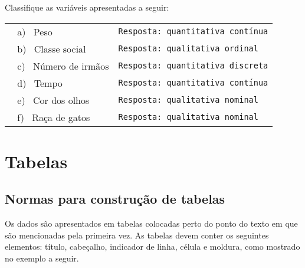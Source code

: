 \documentclass[11pt,fleqn]{book} %
\begin{document}
\begin{example} \label{exemp:tipoVar}
	Classifique as variáveis apresentadas a seguir:

	\begin{table}[h]
	\begin{tabular}{l l}
	\,\,\, a) \, Peso & \footnotesize\texttt{Resposta: quantitativa contínua}\\
	\,\,\, b) \, Classe social & \footnotesize\texttt{Resposta: qualitativa ordinal}\\
	\,\,\, c) \, Número de irmãos & \footnotesize\texttt{Resposta: quantitativa discreta}\\
	\,\,\, d) \, Tempo & \footnotesize\texttt{Resposta: quantitativa contínua}\\
	\,\,\, e) \, Cor dos olhos & \footnotesize\texttt{Resposta: qualitativa nominal}\\
	\,\,\, f) \ Raça de gatos & \footnotesize\texttt{Resposta: qualitativa nominal}\\
	\end{tabular}
	\end{table}
\end{example}




\chapter{Tabelas}

\section{Normas para construção de tabelas}

Os dados são apresentados em tabelas colocadas perto do ponto do texto em que são mencionadas pela primeira vez. As tabelas devem conter os seguintes elementos: título, cabeçalho, indicador de linha, célula e moldura, como mostrado no exemplo a seguir.\\
\end{document}
